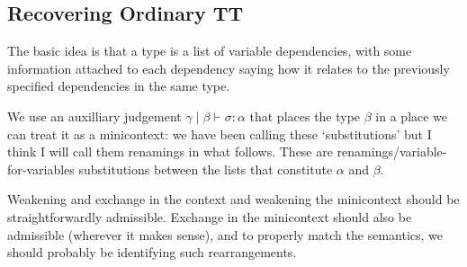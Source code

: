\documentclass[10pt]{article}
\let\emptyset\varnothing
\newcommand{\yields}{\vdash}
\newcommand{\type}{\,\,\mathsf{type}}
\begin{document}
\subsection{Recovering Ordinary TT}

The basic idea is that a type is a list of variable dependencies, with some information attached to each dependency saying how it relates to the previously specified dependencies in the same type.

We use an auxilliary judgement $\gamma \mid \beta \yields \sigma : \alpha$ that places the type $\beta$ in a place we can treat it as a minicontext: we have been calling these `substitutions' but I think I will call them renamings in what follows. These are renamings/variable-for-variables substitutions between the lists that constitute $\alpha$ and $\beta$.

Weakening and exchange in the context and weakening the minicontext should be straightforwardly admissible. Exchange in the minicontext should also be admissible (wherever it makes sense), and to properly match the semantics, we should probably be identifying such rearrangements.

\end{document}
